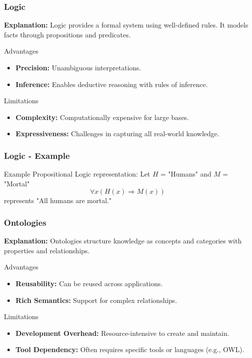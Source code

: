 \documentclass[aspectratio=169]{beamer}
\begin{document}
\begin{frame}[fragile]
    \frametitle{Logic}
    \textbf{Explanation:} Logic provides a formal system using well-defined rules. It models facts through propositions and predicates.

    \begin{block}{Advantages}
        \begin{itemize}
            \item \textbf{Precision:} Unambiguous interpretations.
            \item \textbf{Inference:} Enables deductive reasoning with rules of inference.
        \end{itemize}
    \end{block}

    \begin{block}{Limitations}
        \begin{itemize}
            \item \textbf{Complexity:} Computationally expensive for large bases.
            \item \textbf{Expressiveness:} Challenges in capturing all real-world knowledge.
        \end{itemize}
    \end{block}
\end{frame}

\begin{frame}[fragile]
    \frametitle{Logic - Example}
    \begin{block}{Example}
        Propositional Logic representation:
        Let \( H \) = "Humans" and \( M \) = "Mortal"
        \[
        \forall x (H(x) \Rightarrow M(x))
        \]
        represents "All humans are mortal."
    \end{block}
\end{frame}

\begin{frame}[fragile]
    \frametitle{Ontologies}
    \textbf{Explanation:} Ontologies structure knowledge as concepts and categories with properties and relationships.

    \begin{block}{Advantages}
        \begin{itemize}
            \item \textbf{Reusability:} Can be reused across applications.
            \item \textbf{Rich Semantics:} Support for complex relationships.
        \end{itemize}
    \end{block}

    \begin{block}{Limitations}
        \begin{itemize}
            \item \textbf{Development Overhead:} Resource-intensive to create and maintain.
            \item \textbf{Tool Dependency:} Often requires specific tools or languages (e.g., OWL).
        \end{itemize}
    \end{block}
\end{frame}
\end{document}
